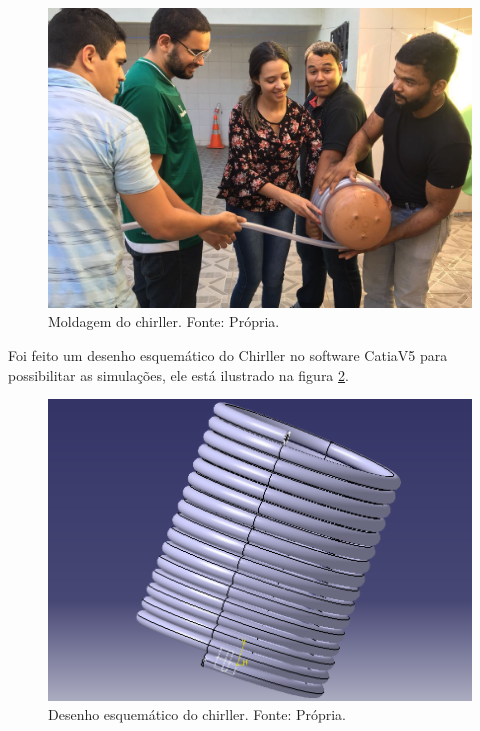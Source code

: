                         \begin{figure}[!htb]
                            \centering
                            \includegraphics[scale= 0.3]{figuras/moldagem-chiller.png}
                            \caption{Moldagem do chirller. Fonte: Própria.}
                            \label{moldagem-chiller}
                        \end{figure}

                        Foi feito um desenho esquemático do Chirller no software CatiaV5 para
                        possibilitar as simulações, ele está ilustrado na figura \ref{desenho-chiller}.

                        \begin{figure}[!htb]
                            \centering
                            \includegraphics[scale= 0.3]{figuras/desenho-chiller.png}
                            \caption{Desenho esquemático do chirller. Fonte: Própria.}
                            \label{desenho-chiller}
                        \end{figure}

